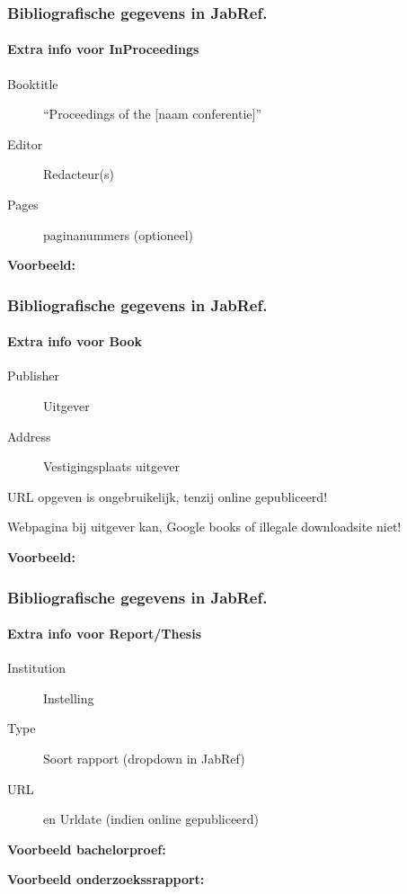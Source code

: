 \documentclass[aspectratio=169]{beamer}
\begin{document}
\begin{frame}[plain]
  \frametitle{Bibliografische gegevens in JabRef.}
  \framesubtitle{Extra info voor InProceedings}

  \begin{description}
    \item[Booktitle] ``Proceedings of the [naam conferentie]''
    \item[Editor] Redacteur(s)
    \item[Pages] paginanummers (optioneel)
  \end{description}

  \medskip

  \textbf{Voorbeeld:}

\end{frame}

\begin{frame}[plain]
  \frametitle{Bibliografische gegevens in JabRef.}
  \framesubtitle{Extra info voor Book}

  \begin{description}
    \item[Publisher] Uitgever
    \item[Address] Vestigingsplaats uitgever
  \end{description}

  \medskip

  URL opgeven is ongebruikelijk, tenzij online gepubliceerd!
  
  Webpagina bij uitgever kan, Google books of illegale downloadsite niet!

  \medskip

  \textbf{Voorbeeld:}

\end{frame}

\begin{frame}
  \frametitle{Bibliografische gegevens in JabRef.}
  \framesubtitle{Extra info voor Report/Thesis}

  \begin{description}
    \item[Institution] Instelling
    \item[Type] Soort rapport (dropdown in JabRef)
    \item[URL]  en Urldate (indien online gepubliceerd)
  \end{description}

\end{frame}

\begin{frame}[plain]

  \textbf{Voorbeeld bachelorproef:}


  \medskip

  \textbf{Voorbeeld onderzoekssrapport:}


\end{frame}
\end{document}

